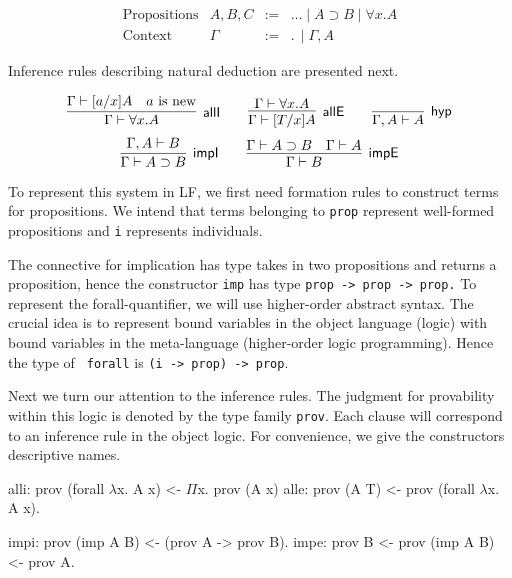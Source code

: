 \documentclass{llncs}
\newcommand{\impl}{\supset}
\newcommand{\ldot}{.\,}
\begin{document}
\[
\begin{array}{llll}
\mbox{Propositions} & A,B, C & := & \ldots \mid A \impl B \mid \forall x.A \\
\mbox{Context} & \Gamma & := & \ldot \mid \Gamma,  A
\end{array}
\]

Inference rules describing natural deduction are presented next.

\[
\infer[{\textsf{allI}}]{\Gamma\vdash \forall x. A}
{\Gamma\vdash [a/x]A & a \mbox{ is new}}
\qquad
\infer[{\textsf{allE}}]{\Gamma\vdash [T/x]A}
{\Gamma\vdash \forall x.A}
\qquad
\infer[{\textsf{hyp}}]{\Gamma, A \vdash A}
{}
\]
\[
\infer[{\textsf{impI}}]{\Gamma\vdash A\impl B}
{\Gamma,A\vdash B}
\qquad
\infer[{\textsf{impE}}]{\Gamma\vdash B}
{\Gamma\vdash A\impl B
\quad
\Gamma\vdash A}
\]

To represent this system in LF, we first need formation rules to
construct terms for propositions.  We intend that terms belonging to
{\tt prop} represent well-formed propositions and {\tt i} represents individuals.  

%
The connective for implication has type takes in two propositions and
returns a proposition, hence the constructor {\tt imp} has type {\tt prop -> prop -> prop.} To represent the forall-quantifier, we will use
higher-order abstract syntax. The crucial idea is to represent bound
variables in the object language (logic) with bound variables in the
meta-language (higher-order logic programming). Hence the type of {\tt
  forall} is {\tt (i -> prop) -> prop}.

Next we turn our attention to the inference rules. The 
judgment for provability within this logic is denoted by the
type family {\tt prov}.
%
%
Each clause will correspond to an inference rule in the object
logic. For convenience, we give the constructors descriptive names.

\hspace{-0.65cm}
\begin{small}
\begin{minipage}[t]{5.5cm}
\begin{code}
alli: prov (forall $\lambda$x. A x)
      <- $\Pi$x. prov (A x)
alle: prov (A T)
      <- prov (forall $\lambda$x. A x).
 \end{code}
 \end{minipage}
\begin{minipage}[t]{5.5cm}
\begin{code}
impi: prov (imp A B)
      <- (prov A -> prov B).
impe: prov B
      <- prov (imp A B)
      <- prov A.
\end{code}
\end{minipage}
  
\end{small}
\end{document}
